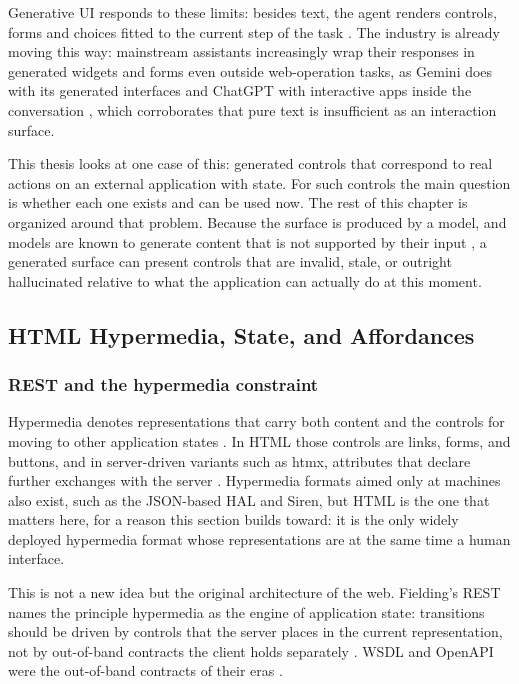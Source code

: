 Generative UI responds to these limits: besides text, the agent renders controls, forms and choices fitted to the current step of the task \cite{leviathan2025generative, aisdkGUI}.
The industry is already moving this way: mainstream assistants increasingly wrap their responses in generated widgets and forms even outside web-operation tasks, as Gemini does with its generated interfaces and ChatGPT with interactive apps inside the conversation \cite{googleGenUI2025, openaiApps2025}, which corroborates that pure text is insufficient as an interaction surface.

This thesis looks at one case of this: generated controls that correspond to real actions on an external application with state.
For such controls the main question is whether each one exists and can be used now.
The rest of this chapter is organized around that problem.
Because the surface is produced by a model, and models are known to generate content that is not supported by their input \cite{ji2023survey}, a generated surface can present controls that are invalid, stale, or outright hallucinated relative to what the application can actually do at this moment.

\subsection{HTML Hypermedia, State, and Affordances}\label{sec:bg:hypermedia}

\subsubsection{REST and the hypermedia constraint}

Hypermedia denotes representations that carry both content and the controls for moving to other application states \cite{hypermediaBook}.
In HTML those controls are links, forms, and buttons, and in server-driven variants such as htmx, attributes that declare further exchanges with the server \cite{htmxlDocs}.
Hypermedia formats aimed only at machines also exist, such as the JSON-based HAL and Siren, but HTML is the one that matters here, for a reason this section builds toward: it is the only widely deployed hypermedia format whose representations are at the same time a human interface.

This is not a new idea but the original architecture of the web.
Fielding's REST names the principle hypermedia as the engine of application state: transitions should be driven by controls that the server places in the current representation, not by out-of-band contracts the client holds separately \cite{fielding2000architectural, hypermediaBook}.
WSDL and OpenAPI were the out-of-band contracts of their eras \cite{wsdl2001, openapi2021}.

